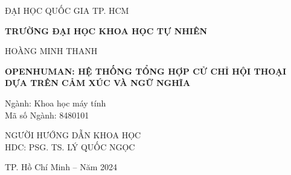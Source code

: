 \pagebreak





\begin{titlepage}

\begin{mdframed}[linewidth=1pt, 
	linecolor=black, 
	innerleftmargin=10mm, 
	innerrightmargin=10mm, 
	innertopmargin=10mm, 
	innerbottommargin=10mm]

	\centering
	\vspace*{1cm}
	
	{ ĐẠI HỌC QUỐC GIA TP. HCM\par}
	\vspace{0.25cm}
	\textbf{TRƯỜNG ĐẠI HỌC KHOA HỌC TỰ NHIÊN}\\
	
	\vspace{2cm}
	
	\large HOÀNG MINH THANH \\
	
	\vspace{2cm}
	
	\Large \textbf{\MakeUppercase{OpenHuman: Hệ thống tổng hợp cử chỉ hội thoại dựa trên cảm xúc và ngữ nghĩa}}\\
	
	\vspace{1cm}
	
	\flushleft
	{\normalsize Ngành: Khoa học máy tính}\\
	{ \normalsize Mã số Ngành: 8480101}\\
	
	\vspace{2cm}
	
	\centering
	{\normalsize NGƯỜI HƯỚNG DẪN KHOA HỌC } \\ 
	{\normalsize HDC: PSG. TS. LÝ QUỐC NGỌC} \\
	
	\vfill
	\vspace{3cm}
	
	
	{\small TP. Hồ Chí Minh – Năm 2024}
\end{mdframed}
\end{titlepage}



\pagebreak
{}


\pagebreak
